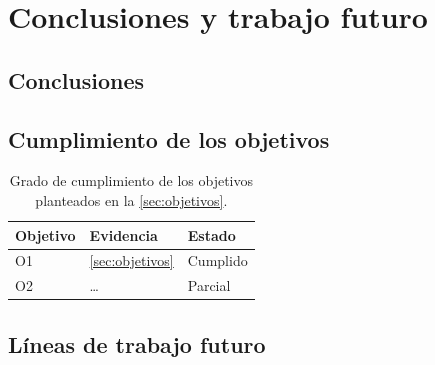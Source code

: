\chapter{Conclusiones y trabajo futuro}\label{cap:conclusiones}

\section{Conclusiones}

\section{Cumplimiento de los objetivos}

\begin{table}[H]
  \centering
  \caption{Grado de cumplimiento de los objetivos planteados en la \cref{sec:objetivos}.}
  \label{tab:cumplimiento}
  \begin{tabularx}{\linewidth}{lXl}
    \toprule
    Objetivo & Evidencia & Estado \\
    \midrule
    O1 & \cref{sec:objetivos} & Cumplido \\
    O2 & \ldots & Parcial \\
    \bottomrule
  \end{tabularx}
\end{table}

\section{Líneas de trabajo futuro}
